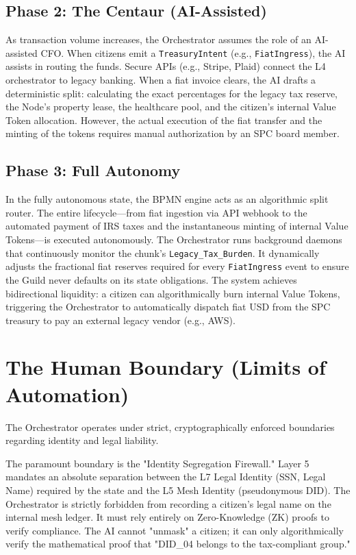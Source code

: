 \subsection{Phase 2: The Centaur (AI-Assisted)}
As transaction volume increases, the Orchestrator assumes the role of an AI-assisted CFO. When citizens emit a \texttt{TreasuryIntent} (e.g., \texttt{FiatIngress}), the AI assists in routing the funds. Secure APIs (e.g., Stripe, Plaid) connect the L4 orchestrator to legacy banking. When a fiat invoice clears, the AI drafts a deterministic split: calculating the exact percentages for the legacy tax reserve, the Node's property lease, the healthcare pool, and the citizen's internal Value Token allocation. However, the actual execution of the fiat transfer and the minting of the tokens requires manual authorization by an SPC board member.

\subsection{Phase 3: Full Autonomy}
In the fully autonomous state, the BPMN engine acts as an algorithmic split router. The entire lifecycle---from fiat ingestion via API webhook to the automated payment of IRS taxes and the instantaneous minting of internal Value Tokens---is executed autonomously. The Orchestrator runs background daemons that continuously monitor the chunk's \texttt{Legacy\_Tax\_Burden}. It dynamically adjusts the fractional fiat reserves required for every \texttt{FiatIngress} event to ensure the Guild never defaults on its state obligations. The system achieves bidirectional liquidity: a citizen can algorithmically burn internal Value Tokens, triggering the Orchestrator to automatically dispatch fiat USD from the SPC treasury to pay an external legacy vendor (e.g., AWS).

\section{The Human Boundary (Limits of Automation)}
The Orchestrator operates under strict, cryptographically enforced boundaries regarding identity and legal liability.

The paramount boundary is the "Identity Segregation Firewall." Layer 5 mandates an absolute separation between the L7 Legal Identity (SSN, Legal Name) required by the state and the L5 Mesh Identity (pseudonymous DID). The Orchestrator is strictly forbidden from recording a citizen's legal name on the internal mesh ledger. It must rely entirely on Zero-Knowledge (ZK) proofs to verify compliance. The AI cannot "unmask" a citizen; it can only algorithmically verify the mathematical proof that "DID\_04 belongs to the tax-compliant group."

